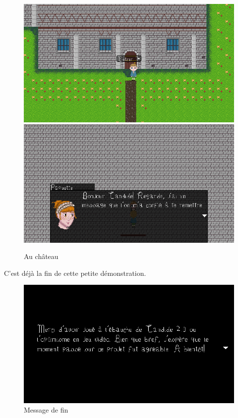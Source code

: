 \documentclass[11pt]{article}
\begin{document}
\begin{figure}[H]
\includegraphics[scale=0.29]{gameplay9}
\includegraphics[scale=0.29]{gameplay11}
\centering
\caption{Au château}
\end{figure}
\newpage
C'est déjà la fin de cette petite démonstration. 
\begin{figure}[H]
\includegraphics[scale=0.35]{gameplay12}
\centering
\caption{Message de fin}
\end{figure}
\end{document}

